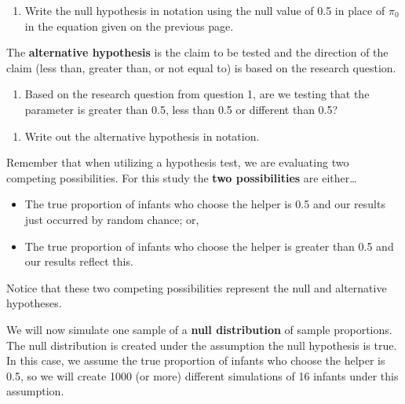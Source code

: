 \documentclass[
]{report}
\providecommand{\tightlist}{%
  \setlength{\itemsep}{0pt}\setlength{\parskip}{0pt}}
\begin{document}
\begin{enumerate}
\def\labelenumi{\arabic{enumi}.}
\setcounter{enumi}{6}
\tightlist
\item
  Write the null hypothesis in notation using the null value of 0.5 in place of \(\pi_0\) in the equation given on the previous page.
\end{enumerate}

\vspace{0.5in}

The \textbf{alternative hypothesis} is the claim to be tested and the direction of the claim (less than, greater than, or not equal to) is based on the research question.

\begin{enumerate}
\def\labelenumi{\arabic{enumi}.}
\setcounter{enumi}{7}
\tightlist
\item
  Based on the research question from question 1, are we testing that the parameter is greater than 0.5, less than 0.5 or different than 0.5?
\end{enumerate}

\vspace{0.2in}

\begin{enumerate}
\def\labelenumi{\arabic{enumi}.}
\setcounter{enumi}{8}
\tightlist
\item
  Write out the alternative hypothesis in notation.
\end{enumerate}

\vspace{0.5in}

Remember that when utilizing a hypothesis test, we are evaluating two competing possibilities. For this study the \textbf{two possibilities} are either\ldots{}

\begin{itemize}
\item
  The true proportion of infants who choose the helper is 0.5 and our results just occurred by random chance; or,
\item
  The true proportion of infants who choose the helper is greater than 0.5 and our results reflect this.
\end{itemize}

Notice that these two competing possibilities represent the null and alternative hypotheses.

We will now simulate one sample of a \textbf{null distribution} of sample proportions. The null distribution is created under the assumption the null hypothesis is true. In this case, we assume the true proportion of infants who choose the helper is 0.5, so we will create 1000 (or more) different simulations of 16 infants under this assumption.
\end{document}

